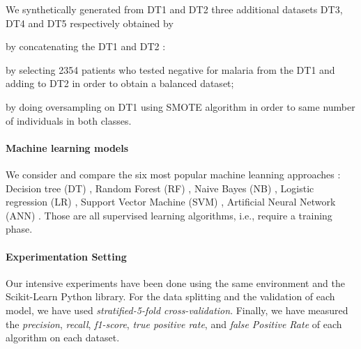 We synthetically generated from DT1 and DT2 three additional datasets DT3, DT4 and DT5  respectively obtained by 
\begin{inparaenum}[(i)]
 \item by concatenating the DT1 and DT2 :
\item by selecting 2354 patients who tested negative for malaria from the DT1 and adding to DT2 in order to obtain a balanced dataset;
\item by doing oversampling on DT1 using SMOTE algorithm in order to same number of individuals in both classes.
\end{inparaenum}

\paragraph*{Machine learning models}
We consider and compare the six most popular machine leanning approaches \cite{de2018binary,tomar2013survey}: 
Decision tree (DT)  \cite{Ro05}, Random Forest (RF) \cite{Be01},  Naive Bayes (NB) \cite{Ka17},
Logistic regression (LR) \cite{Ph88}, Support Vector Machine (SVM) \cite{Ev01}, Artificial Neural Network (ANN) \cite{Me19}.
Those are all supervised learning algorithms, i.e., require a training phase.

 \paragraph*{Experimentation Setting}
Our intensive experiments have been done using the same environment and the Scikit-Learn Python library. For the data splitting and the validation of each model, we have used \emph{stratified-5-fold cross-validation}. Finally, we have measured 
 the \emph{precision}, \emph{recall}, \emph{f1-score}, \emph{true positive rate}, and
 \emph{false Positive Rate} of each algorithm on each dataset. 